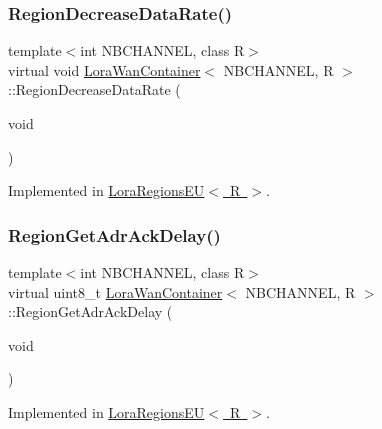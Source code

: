 \subsubsection{\texorpdfstring{Region\+Decrease\+Data\+Rate()}{RegionDecreaseDataRate()}}
{\footnotesize\ttfamily template$<$int N\+B\+C\+H\+A\+N\+N\+EL, class R$>$ \\
virtual void \mbox{\hyperlink{class_lora_wan_container}{Lora\+Wan\+Container}}$<$ N\+B\+C\+H\+A\+N\+N\+EL, R $>$\+::Region\+Decrease\+Data\+Rate (\begin{DoxyParamCaption}\item[{void}]{ }\end{DoxyParamCaption})\hspace{0.3cm}{\ttfamily [pure virtual]}}



Implemented in \mbox{\hyperlink{class_lora_regions_e_u_ad6bf116000ec083c6e7e0a7f930aa2c6}{Lora\+Regions\+E\+U$<$ R $>$}}.

\mbox{\label{class_lora_wan_container_ad90b5c47b794730a1027a548f20fd63c}} 
\subsubsection{\texorpdfstring{Region\+Get\+Adr\+Ack\+Delay()}{RegionGetAdrAckDelay()}}
{\footnotesize\ttfamily template$<$int N\+B\+C\+H\+A\+N\+N\+EL, class R$>$ \\
virtual uint8\+\_\+t \mbox{\hyperlink{class_lora_wan_container}{Lora\+Wan\+Container}}$<$ N\+B\+C\+H\+A\+N\+N\+EL, R $>$\+::Region\+Get\+Adr\+Ack\+Delay (\begin{DoxyParamCaption}\item[{void}]{ }\end{DoxyParamCaption})\hspace{0.3cm}{\ttfamily [pure virtual]}}



Implemented in \mbox{\hyperlink{class_lora_regions_e_u_a4e27410febd49bfc58d3bf986177c1e7}{Lora\+Regions\+E\+U$<$ R $>$}}.

\mbox{\label{class_lora_wan_container_ab68ac169b3edd9aacc7a9c40976dc231}} 

